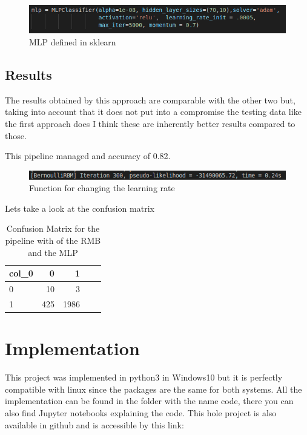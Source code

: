 \documentclass{article} %
\begin{document}
\begin{figure}[h!]
  \includegraphics[scale = 0.7]{mlpsk.png}
  \centering
  \caption{MLP defined in sklearn}\hspace*{\fill}
  \label{fig:a}
\end{figure}



\bigskip

\subsection{Results}

The results obtained by this approach are comparable with the other two but, taking into account that  it does not put into a compromise the testing data like the first approach does I think these are inherently better results compared to those.

This pipeline managed and accuracy of 0.82.


\begin{figure}[h!]
  \includegraphics[scale = 0.7]{epoch300.png}
  \centering
  \caption{Function for changing the learning rate}\hspace*{\fill}
  \label{fig:a}
\end{figure}

Lets take a look at the confusion matrix

\begin{table}[!h]
\centering
\begin{tabular}{lrrrr}
\toprule \hline
col\_0 &   0 &   1 & \\\hline
0     &  10 &   3 & \\\hline
1     &   425 &  1986  \\\hline
\bottomrule \hline
\end{tabular}
\caption{Confusion Matrix for the pipeline with of the RMB and the MLP}
 \label{tab:CG}
\end{table}
\bigskip
\bigskip

\section{Implementation}
This project was implemented in python3 in Windows10 but it is perfectly compatible with linux since the packages are the same for both systems. All the implementation can be found in the folder with the name code, there you can also find Jupyter notebooks explaining the code. This hole project is also available in github and is accessible by this link:
\smallskip
\end{document}
